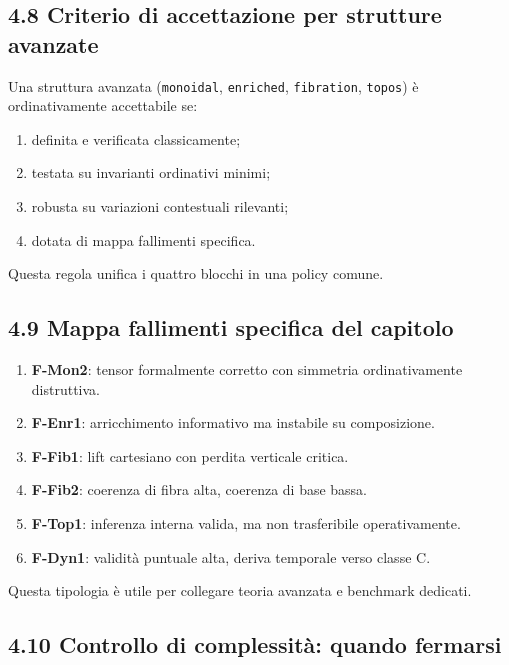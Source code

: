 \subsection{4.8 Criterio di accettazione per strutture avanzate}

Una struttura avanzata (\texttt{monoidal}, \texttt{enriched}, \texttt{fibration}, \texttt{topos}) è ordinativamente accettabile se:

\begin{enumerate}
\def\labelenumi{\arabic{enumi}.}
\tightlist
\item
  definita e verificata classicamente;
\item
  testata su invarianti ordinativi minimi;
\item
  robusta su variazioni contestuali rilevanti;
\item
  dotata di mappa fallimenti specifica.
\end{enumerate}

Questa regola unifica i quattro blocchi in una policy comune.

\subsection{4.9 Mappa fallimenti specifica del capitolo}

\begin{enumerate}
\def\labelenumi{\arabic{enumi}.}
\tightlist
\item
  \textbf{F-Mon2}: tensor formalmente corretto con simmetria ordinativamente distruttiva.
\item
  \textbf{F-Enr1}: arricchimento informativo ma instabile su composizione.
\item
  \textbf{F-Fib1}: lift cartesiano con perdita verticale critica.
\item
  \textbf{F-Fib2}: coerenza di fibra alta, coerenza di base bassa.
\item
  \textbf{F-Top1}: inferenza interna valida, ma non trasferibile operativamente.
\item
  \textbf{F-Dyn1}: validità puntuale alta, deriva temporale verso classe C.
\end{enumerate}

Questa tipologia è utile per collegare teoria avanzata e benchmark dedicati.

\subsection{4.10 Controllo di complessità: quando fermarsi}

